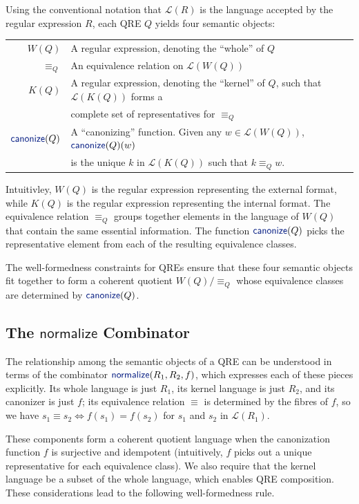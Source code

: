 \documentclass[acmsmall,review,anonymous]{acmart}
\newcommand{\kw}[1]{\textcolor{dkblue}{\ensuremath{\mathsf{#1}}}}
\newcommand{\normalize}[3]{\ensuremath{\kw{normalize}(#1, #2, #3)}}
\newcommand{\eqrel}[1]{\ensuremath{\equiv_{#1}}}
\newcommand{\canonize}{\ensuremath{\kw{canonize}}}
\begin{document}
Using the conventional notation that $\mathcal{L}(R)$ is the language accepted
by the regular expression $R$, each QRE $Q$ yields four semantic
objects:

\begin{tabular}{rl}
  $W(Q)$       & A regular expression, denoting the ``whole'' of $Q$\\
  $\eqrel{Q}$  & An equivalence relation on $\mathcal{L}(W(Q))$\\
  $K(Q)$       & A regular expression, denoting the ``kernel'' of $Q$, such that
                  $\mathcal{L}(K(Q))$ forms a \\
               & complete set of representatives for $\eqrel{Q}$ \\
  $\canonize(Q)$ & 
  A ``canonizing'' function. Given any $w \in \mathcal{L}(W(Q))$,
  $\canonize(Q)(w)$ \\ & is the unique $k$ in $\mathcal{L}(K(Q))$ such
  that $k \eqrel{Q} w$.
\end{tabular}

\noindent
Intuitivley, $W(Q)$ is the regular expression representing the
external format, while $K(Q)$ is the regular expression representing
the internal format.  The equivalence relation $\eqrel{Q}$ groups
together elements in the language of $W(Q)$ that contain the same
essential information.  The function $\canonize(Q)$ picks the
representative element from each of the resulting equivalence classes.

The well-formedness constraints for QREs ensure that these four semantic
objects fit together to form a coherent quotient $W(Q)/\eqrel{Q}$ whose
equivalence classes are determined by $\canonize(Q)$.

\subsection{The \kw{normalize} Combinator}

The relationship among the semantic objects of a QRE can be understood in terms
of the combinator \normalize{R_1}{R_2}{f}, which expresses each of these pieces
explicitly.  Its whole language is just $R_1$, its kernel language is just
$R_2$, and its canonizer is just $f$; 
its equivalence relation $\equiv$ is
determined by the fibres of $f$, so we have
$s_1 \equiv s_2 \Leftrightarrow f(s_1) = f(s_2)$ for $s_1$ and $s_2$
in $\mathcal{L}(R_1)$.

These components form a coherent quotient language when the canonization
function $f$ is surjective and idempotent (intuitively, $f$ picks out a unique
representative for each equivalence class).  We also require that the kernel
language be a subset of the whole language, which enables QRE composition.
These considerations lead to the following well-formedness rule.
\end{document}
